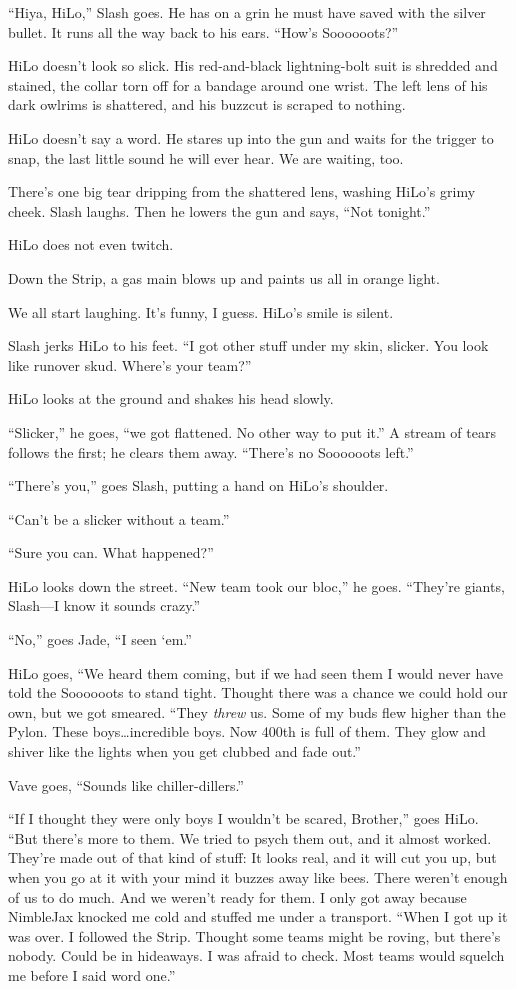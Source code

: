 ``Hiya, HiLo,'' Slash goes. He has on a grin he must have saved with the silver bullet. It runs all the way back to his ears. ``How's Soooooots?''

HiLo doesn't look so slick. His red-and-black lightning-bolt suit is shredded and stained, the collar torn off for a bandage around one wrist. The left lens of his dark owlrims is shattered, and his buzzcut is scraped to nothing.

HiLo doesn't say a word. He stares up into the gun and waits for the trigger to snap, the last little sound he will ever hear. We are waiting, too.

There's one big tear dripping from the shattered lens, washing HiLo's grimy cheek. Slash laughs. Then he lowers the gun and says, ``Not tonight.''

HiLo does not even twitch.

Down the Strip, a gas main blows up and paints us all in orange light.

We all start laughing. It's funny, I guess. HiLo's smile is silent.

Slash jerks HiLo to his feet. ``I got other stuff under my skin, slicker. You look like runover skud. Where's your team?''

HiLo looks at the ground and shakes his head slowly.

``Slicker,'' he goes, ``we got flattened. No other way to put it.'' A stream of tears follows the first; he clears them away. ``There's no Soooooots left.''

``There's you,'' goes Slash, putting a hand on HiLo's shoulder.

``Can't be a slicker without a team.''

``Sure you can. What happened?''

HiLo looks down the street. ``New team took our bloc,'' he goes. ``They're giants, Slash—I know it sounds crazy.''

``No,'' goes Jade, ``I seen ‘em.''

HiLo goes, ``We heard them coming, but if we had seen them I would never have told the Soooooots to stand tight. Thought there was a chance we could hold our own, but we got smeared. ``They \textit{threw} us. Some of my buds flew higher than the Pylon. These boys\ldots incredible boys. Now 400th is full of them. They glow and shiver like the lights when you get clubbed and fade out.''

Vave goes, ``Sounds like chiller-dillers.''

``If I thought they were only boys I wouldn't be scared, Brother,'' goes HiLo. ``But there's more to them. We tried to psych them out, and it almost worked. They're made out of that kind of stuff: It looks real, and it will cut you up, but when you go at it with your mind it buzzes away like bees. There weren't enough of us to do much. And we weren't ready for them. I only got away because NimbleJax knocked me cold and stuffed me under a transport.
``When I got up it was over. I followed the Strip. Thought some teams might be roving, but there's nobody. Could be in hideaways. I was afraid to check. Most teams would squelch me before I said word one.''

